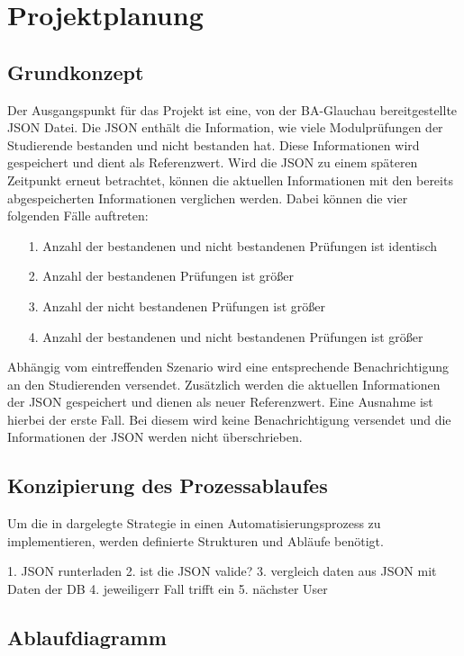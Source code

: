 \chapter{Projektplanung}
\label{Projektplanung}

\section{Grundkonzept}
\label{Grundkonzept}

Der Ausgangspunkt für das Projekt ist eine, von der BA-Glauchau bereitgestellte \ac{JSON} Datei.
Die \ac{JSON} enthält die Information, wie viele Modulprüfungen der Studierende bestanden und nicht bestanden hat.
Diese Informationen wird gespeichert und dient als Referenzwert.
Wird die \ac{JSON} zu einem späteren Zeitpunkt erneut betrachtet, können die aktuellen Informationen mit den bereits abgespeicherten Informationen verglichen werden.
Dabei können die vier folgenden Fälle auftreten:
\begin{itemize}
    \item[1.] Anzahl der bestandenen und nicht bestandenen Prüfungen ist identisch
    \item[2.] Anzahl der bestandenen Prüfungen ist größer
    \item[3.] Anzahl der nicht bestandenen Prüfungen ist größer
    \item[4.] Anzahl der bestandenen und nicht bestandenen Prüfungen ist größer
\end{itemize}

Abhängig vom eintreffenden Szenario wird eine entsprechende Benachrichtigung an den Studierenden versendet.
Zusätzlich werden die aktuellen Informationen der \ac{JSON} gespeichert und dienen als neuer Referenzwert.
Eine Ausnahme ist hierbei der erste Fall.
Bei diesem wird keine Benachrichtigung versendet und die Informationen der \ac{JSON} werden nicht überschrieben.



\section{Konzipierung des Prozessablaufes}
Um die in  dargelegte Strategie in einen Automatisierungsprozess zu implementieren, werden definierte Strukturen und Abläufe benötigt.



1. JSON runterladen
2. ist die JSON valide?
3. vergleich daten aus JSON mit Daten der DB
4. jeweiligerr Fall trifft ein
5. nächster User


 
\section{Ablaufdiagramm}